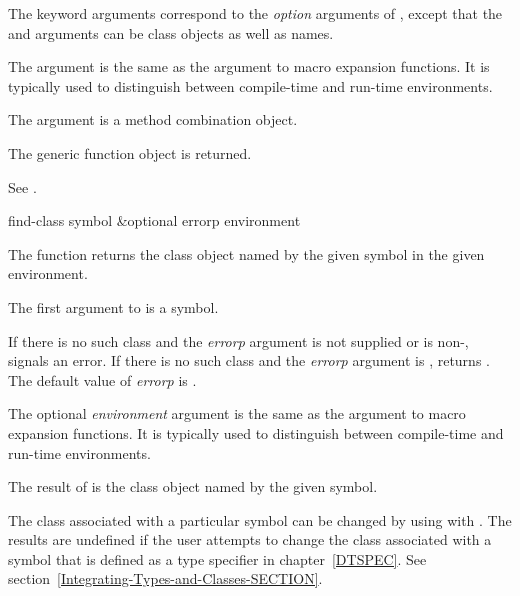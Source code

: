\begin{defun}[Function]
The keyword arguments correspond to the \emph{option} arguments of
, except that the  and
 arguments can be class objects
as well as names.

The  argument is the same as the 
 argument to macro expansion functions.  It is typically
used to distinguish between compile-time and run-time environments.

The  argument is a method combination object.

The generic function object is returned.

See .
\end{defun}

\begin{defun}[Function]
find-class symbol &optional errorp environment

The function  returns the class object named by the
given symbol in the given environment.

The first argument to  is a symbol. 

If there is no such class and the \emph{errorp} argument is
not supplied or is non-,  signals an error.
If there is no such class and the \emph{errorp} argument is
,  returns .  The default value of
\emph{errorp} is .

The optional \emph{environment} argument is the same as the 
 argument to macro expansion functions.  It is typically
used to distinguish between compile-time and run-time environments.

The result of  is the class object named by the given symbol.

The class associated with a particular symbol can be changed by using
 with .  The results are undefined if
the user attempts to change the class associated with a symbol that is
defined as a type specifier in chapter~\ref{DTSPEC}.
See section~\ref{Integrating-Types-and-Classes-SECTION}.
\end{defun}


